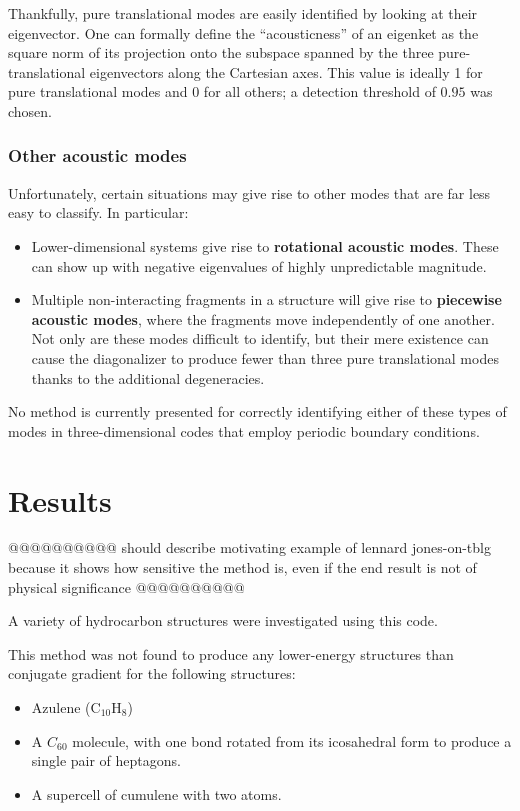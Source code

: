 \documentclass[11pt]{article}
\theoremstyle{definition}
\theoremstyle{remark}
\newcommand{\chem}[1]{\ensuremath{\mathrm{#1}}}
\begin{document}
Thankfully, pure translational modes are easily identified by looking at their eigenvector.  One can formally define the ``acousticness'' of an eigenket as the square norm of its projection onto the subspace spanned by the three pure-translational eigenvectors along the Cartesian axes.  This value is ideally 1 for pure translational modes and 0 for all others; a detection threshold of $0.95$ was chosen.

\subsubsection{Other acoustic modes}

Unfortunately, certain situations may give rise to other modes that are far less easy to classify.  In particular:

\begin{itemize}
	\item Lower-dimensional systems give rise to \textbf{rotational acoustic modes}.  These can show up with negative eigenvalues of highly unpredictable magnitude.
	\item Multiple non-interacting fragments in a structure will give rise to \textbf{piecewise acoustic modes}, where the fragments move independently of one another.  Not only are these modes difficult to identify, but their mere existence can cause the diagonalizer to produce fewer than three pure translational modes thanks to the additional degeneracies.
\end{itemize}
No method is currently presented for correctly identifying either of these types of modes in three-dimensional codes that employ periodic boundary conditions.

\section{Results}

@@@@@@@@@@ should describe motivating example of lennard jones-on-tblg because it shows how sensitive the method is, even if the end result is not of physical significance @@@@@@@@@@

A variety of hydrocarbon structures were investigated using this code.

This method was not found to produce any lower-energy structures than conjugate gradient for the following structures:

\begin{itemize}
	\item Azulene (\chem{C_{10}H_8})
	\item A $C_60$ molecule, with one bond rotated from its icosahedral form to produce a single pair of heptagons.
	\item A supercell of cumulene with two atoms.
\end{itemize}
\end{document}
